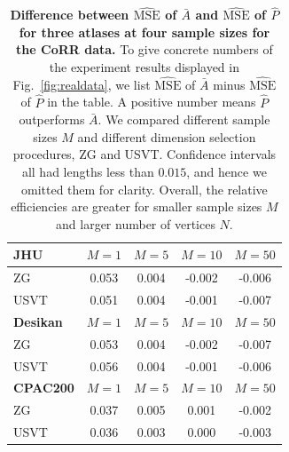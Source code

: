 \documentclass[10pt,letterpaper]{article}
\renewcommand{\hat}{\widehat}
\begin{document}
\begin{table}[!tb]
    \centering
\begin{tabular}{lcccc}\toprule
\multicolumn{1}{l}{\textbf{JHU}} & $M=1$  & $M=5$  & $M=10$ & $M=50$  \\\midrule
ZG      & 0.053 & 0.004 & -0.002 & -0.006  \\
USVT    & 0.051 & 0.004 & -0.001 & -0.007 \\\midrule
\multicolumn{1}{l}{\textbf{Desikan}} & $M=1$  & $M=5$  & $M=10$ & $M=50$  \\ \midrule
ZG      & 0.053 & 0.004 & -0.002 & -0.007 \\
USVT    & 0.056 & 0.004 & -0.001 & -0.006 \\\midrule
\multicolumn{1}{l}{\textbf{CPAC200}} & $M=1$  & $M=5$  & $M=10$ & $M=50$  \\\midrule
ZG      & 0.037 & 0.005 & 0.001 & -0.002 \\
USVT    & 0.036 & 0.003 & 0.000 & -0.003 \\\bottomrule
\end{tabular}
    \caption{{\bf Difference between $\hat{\mathrm{MSE}}$ of $\bar{A}$ and $\hat{\mathrm{MSE}}$ of $\hat{P}$ for three atlases at four sample sizes for the CoRR data.}
    To give concrete numbers of the experiment results displayed in Fig.~\ref{fig:realdata}, we list $\hat{\mathrm{MSE}}$ of $\bar{A}$ minus $\hat{\mathrm{MSE}}$ of $\hat{P}$ in the table. A positive number means $\hat{P}$ outperforms $\bar{A}$.
     We compared different sample sizes $M$ and different dimension selection procedures, ZG and USVT.
    Confidence intervals all had lengths less than $0.015$, and hence we omitted them for clarity.
    Overall, the relative efficiencies are greater for smaller sample sizes $M$ and larger number of vertices $N$. 
    } 
    \label{tab:corr_mse}
\end{table}
\end{document}
